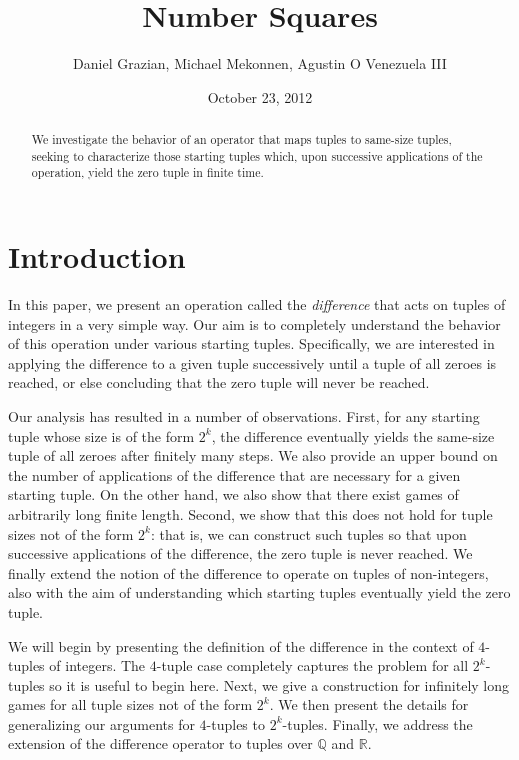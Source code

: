 \documentclass[12pt]{amsart}
\title{Number Squares}
\author{Daniel Grazian, Michael Mekonnen, Agustin O Venezuela III}
\date{October 23, 2012}
\begin{document}
\begin{abstract}
We investigate the behavior of an operator that maps tuples to same-size tuples, seeking to characterize those starting tuples which, upon successive applications of the operation, yield the zero tuple in finite time.
\end{abstract}

\maketitle

\section{Introduction\label{sec:intro}}

In this paper, we present an operation called the \textit{difference} that acts on tuples of integers in a very simple way. Our aim is to completely understand the behavior of this operation under various starting tuples. Specifically, we are interested in applying the difference to a given tuple successively until a tuple of all zeroes is reached, or else concluding that the zero tuple will never be reached.

Our analysis has resulted in a number of observations. First, for any starting tuple whose size is of the form $2^k$, the difference eventually yields the same-size tuple of all zeroes after finitely many steps. We also provide an upper bound on the number of applications of the difference that are necessary for a given starting tuple. On the other hand, we also show that there exist games of arbitrarily long finite length. Second, we show that this does not hold for tuple sizes not of the form $2^k$: that is, we can construct such tuples so that upon successive applications of the difference, the zero tuple is never reached. We finally extend the notion of the difference to operate on tuples of non-integers, also with the aim of understanding which starting tuples eventually yield the zero tuple.

We will begin by presenting the definition of the difference in the context of $4$-tuples of integers. The $4$-tuple case completely captures the problem for all $2^k$-tuples so it is useful to begin here. Next, we give a construction for infinitely long games for all tuple sizes not of the form $2^k$. We then present the details for generalizing our arguments for $4$-tuples to $2^k$-tuples. Finally, we address the extension of the difference operator to tuples over $\mathbb{Q}$ and $\mathbb{R}$.
\end{document}

